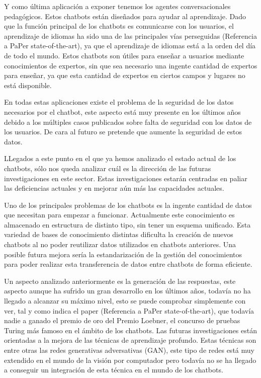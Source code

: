 Y como última aplicación a exponer tenemos los agentes conversacionales pedagógicos. Estos chatbots están diseñados para ayudar al aprendizaje. Dado que la función principal de los chatbots es comunicarse con los usuarios, el aprendizaje de idiomas ha sido una de las principales vías perseguidas (Referencia a PaPer state-of-the-art), ya que el aprendizaje de idiomas está a la orden del día de todo el mundo. Estos chatbots son útiles para enseñar a usuarios mediante conocimientos de expertos, sin que sea necesario una ingente cantidad de expertos para enseñar, ya que esta cantidad de expertos en ciertos campos y lugares no está disponible.

En todas estas aplicaciones existe el problema de la seguridad de los datos necesarios por el chatbot, este aspecto está muy presente en los últimos años debido a los múltiples casos publicados sobre falta de seguridad con los datos de los usuarios. De cara al futuro se pretende que aumente la seguridad de estos datos.

LLegados a este punto en el que ya hemos analizado el estado actual de los chatbots, sólo nos queda analizar cuál es la dirección de las futuras investigaciones en este sector. Estas investigaciones estarán centradas en paliar las deficiencias actuales y en mejorar aún más las capacidades actuales.

Uno de los principales problemas de los chatbots es la ingente cantidad de datos que necesitan para empezar a funcionar. Actualmente este conocimiento es almacenado en estructura de distinto tipo, sin tener un esquema unificado. Esta variedad de bases de conocimiento distintas dificulta la creación de nuevos chatbots al no poder reutilizar datos utilizados en chatbots anteriores. Una posible futura mejora sería la estandarización de la gestión del conocimientos para poder realizar esta transferencia de datos entre chatbots de forma eficiente.

Un aspecto analizado anteriormente es la generación de las respuestas, este aspecto aunque ha sufrido un gran desarrollo en los últimos años, todavía no ha llegado a alcanzar su máximo nivel, esto se puede comprobar simplemente con ver, tal y como indica el paper (Referencia a PaPer state-of-the-art), que todavía nadie a ganado el premio de oro del Premio Loebner, el concurso de pruebas Turing más famoso en el ámbito de los chatbots. Las futuras investigaciones están orientadas a la mejora de las técnicas de aprendizaje profundo. Estas técnicas son entre otras las redes generativas adversativas (GAN), este tipo de redes está muy extendido en el mundo de la visión por computador pero todavía no se ha llegado a conseguir un integración de esta técnica en el mundo de los chatbots.

